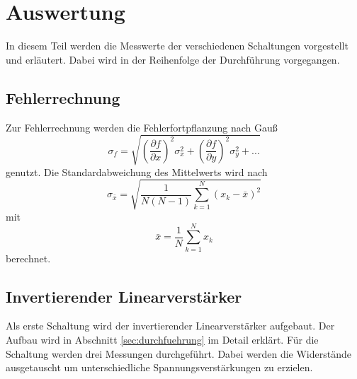 \newpage
\section{Auswertung}
\label{sec:auswertung}
In diesem Teil werden die Messwerte der verschiedenen Schaltungen vorgestellt und erläutert.
Dabei wird in der Reihenfolge der Durchführung vorgegangen.
\subsection{Fehlerrechnung}
Zur Fehlerrechnung werden die Fehlerfortpflanzung nach Gauß
\begin{equation}
    \sigma_f = \sqrt{\left(\frac{\partial f}{\partial x}\right)^2 \sigma_x ^2 + \left( \frac{\partial f}{\partial y}\right)^2 \sigma_y ^2 + ...}
\end{equation}
genutzt.
Die Standardabweichung des Mittelwerts wird nach
\begin{equation}
    \sigma_{\bar{x}} = \sqrt{\frac{1}{N(N-1)} \sum_{k=1}^N (x_k - \bar{x})^2}
\end{equation}
mit 
\begin{equation}
    \bar{x} = \frac{1}{N} \sum_{k=1} ^N x_k
\end{equation}
berechnet.
\subsection{Invertierender Linearverstärker}
Als erste Schaltung wird der invertierender Linearverstärker aufgebaut.
Der Aufbau wird in Abschnitt \ref{sec:durchfuehrung} im Detail erklärt.
Für die Schaltung werden drei Messungen durchgeführt.
Dabei werden die Widerstände ausgetauscht um unterschiedliche Spannungsverstärkungen zu erzielen.

